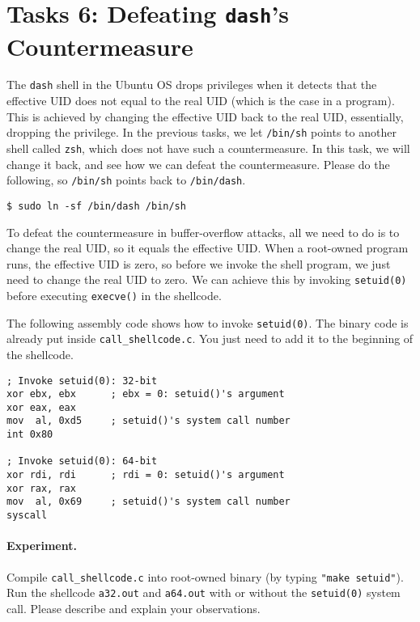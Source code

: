 \section{Tasks 6: Defeating \texttt{dash}'s Countermeasure}

The \texttt{dash} shell in the Ubuntu OS 
drops privileges when it detects that the effective UID does not 
equal to the real UID (which is the case in a \setuid program). 
This is achieved by changing the 
effective UID back to the real UID, essentially, dropping the 
privilege.  In the previous tasks, we let \texttt{/bin/sh} points
to another shell called \texttt{zsh}, which does not have such
a countermeasure. In this task, we will change it back, 
and see how we can defeat the countermeasure. Please 
do the following, so \texttt{/bin/sh} points back to 
\texttt{/bin/dash}. 


\begin{lstlisting}
$ sudo ln -sf /bin/dash /bin/sh
\end{lstlisting}

To defeat the countermeasure in buffer-overflow attacks,
all we need to do is to change the real UID, so it equals the 
effective UID. When a root-owned \setuid program runs, the 
effective UID is zero, so before we invoke the shell program,
we just need to change the real UID to zero.
We can achieve this by invoking \texttt{setuid(0)} before executing 
\texttt{execve()} in the shellcode. 

The following assembly code shows how to invoke
\texttt{setuid(0)}. The binary code is already put inside 
\texttt{call\_shellcode.c}. You just need to add it to the 
beginning of the shellcode. 

\begin{lstlisting}[language={[x86masm]Assembler}]
; Invoke setuid(0): 32-bit
xor ebx, ebx      ; ebx = 0: setuid()'s argument
xor eax, eax
mov  al, 0xd5     ; setuid()'s system call number
int 0x80

; Invoke setuid(0): 64-bit
xor rdi, rdi      ; rdi = 0: setuid()'s argument
xor rax, rax       
mov  al, 0x69     ; setuid()'s system call number
syscall
\end{lstlisting}


\paragraph{Experiment.} Compile \texttt{call\_shellcode.c} into
root-owned binary (by typing \texttt{"make setuid"}). 
Run the shellcode \texttt{a32.out} and \texttt{a64.out} with or without 
the \texttt{setuid(0)} system call. Please describe and explain
your observations. 


